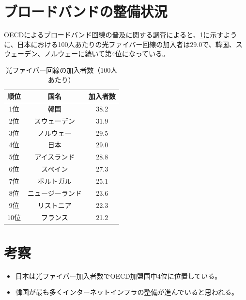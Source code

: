 \documentclass[a4paper,11pt,dvipdfmx]{ujarticle}
\begin{document}
\section{ブロードバンドの整備状況}
OECDによるブロードバンド回線の普及に関する調査\cite{oecd}によると、\ref{tbl:加入者}に示すように、日本における100人あたりの光ファイバー回線の加入者は29.0で、韓国、スウェーデン、ノルウェーに続いて第4位になっている。
\begin{table}[htbp]
    \centering
    \caption{光ファイバー回線の加入者数（100人あたり）}
    \label{tbl:加入者}

    \begin{tabular}{|c|c|c|}
        \hline
        順位 & 国名 & 加入者数 \\
        \hline
        1位 & 韓国 & 38.2\\
        \hline
        2位 & スウェーデン & 31.9\\
        \hline
        3位 & ノルウェー & 29.5\\
        \hline
        4位 & 日本 & 29.0\\
        \hline
        5位 & アイスランド & 28.8\\
        \hline
        6位 & スペイン & 27.3\\
        \hline
        7位 & ポルトガル & 25.1\\
        \hline
        8位 & ニュージーランド & 23.6\\
        \hline
        9位 & リストニア & 22.3\\
        \hline
        10位 & フランス & 21.2\\
        \hline
    \end{tabular}
\end{table}

\section{考察}

%
\begin{itemize}
    \item 日本は光ファイバー加入者数でOECD加盟国中4位に位置している。
    \item 韓国が最も多くインターネットインフラの整備が進んでいると思われる。

\end{itemize}
%



\end{document}
